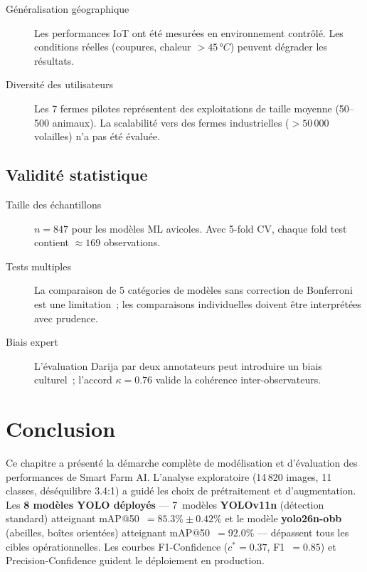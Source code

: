 \begin{description}
  \item[Généralisation géographique] Les performances IoT ont été mesurées en
        environnement contrôlé. Les conditions réelles (coupures, chaleur $> 45\,°C$)
        peuvent dégrader les résultats.
  \item[Diversité des utilisateurs] Les 7 fermes pilotes représentent des exploitations
        de taille moyenne (50--500 animaux). La scalabilité vers des fermes industrielles
        ($> 50\,000$ volailles) n'a pas été évaluée.
\end{description}

\subsection{Validité statistique}

\begin{description}
  \item[Taille des échantillons] $n = 847$ pour les modèles ML avicoles. Avec 5-fold CV,
        chaque fold test contient $\approx 169$ observations.
  \item[Tests multiples] La comparaison de 5 catégories de modèles sans correction de
        Bonferroni est une limitation~; les comparaisons individuelles doivent être
        interprétées avec prudence.
  \item[Biais expert] L'évaluation Darija par deux annotateurs peut introduire un biais
        culturel~; l'accord $\kappa = 0.76$ valide la cohérence inter-observateurs.
\end{description}

\section*{Conclusion}

Ce chapitre a présenté la démarche complète de modélisation et d'évaluation des
performances de Smart Farm AI. L'analyse exploratoire (14\,820 images, 11 classes,
déséquilibre 3.4:1) a guidé les choix de prétraitement et d'augmentation. Les
\textbf{8 modèles YOLO déployés} — 7~modèles \textbf{YOLOv11n} (détection standard)
atteignant mAP@50~$= 85.3\% \pm 0.42\%$ et le modèle \textbf{yolo26n-obb}
(abeilles, boîtes orientées) atteignant mAP@50~$= 92.0\%$ — dépassent tous les
cibles opérationnelles. Les courbes F1-Confidence ($c^* = 0.37$, F1~$= 0.85$)
et Precision-Confidence guident le déploiement en production.


